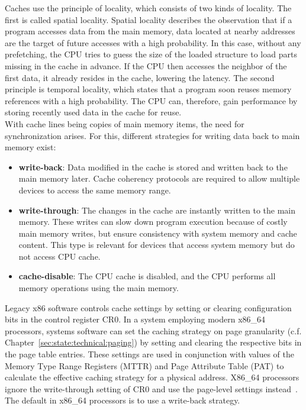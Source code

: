 Caches use the principle of locality, which consists of two kinds of locality.
The first is called spatial locality. Spatial locality describes the observation
that if a program accesses data from the main memory, data located at nearby
addresses are the target of future accesses with a high probability. In this
case, without any prefetching, the CPU tries to guess the size of the loaded
structure to load parts missing in the cache in advance. If the CPU then
accesses the neighbor of the first data, it already resides in the cache,
lowering the latency. The second principle is temporal locality, which states
that a program soon reuses memory references with a high probability. The CPU
can, therefore, gain performance by storing recently used data in the cache for
reuse.\\

With cache lines being copies of main memory items, the need for synchronization
arises. For this, different strategies for writing data back to main memory
exist:
\begin{itemize}
  \item \textbf{write-back}: Data modified in the cache is stored and written
    back to the main memory later. Cache coherency protocols are required to
    allow multiple devices to access the same memory range.
  \item \textbf{write-through}: The changes in the cache are instantly written
    to the main memory. These writes can slow down program execution because of
    costly main memory writes, but ensure consistency with system memory and
    cache content. This type is relevant for devices that access system memory
    but do not access CPU cache.
  \item \textbf{cache-disable}: The CPU cache is disabled, and the CPU
    performs all memory operations using the main memory.
\end{itemize}
Legacy x86 software controls cache settings by setting or clearing configuration
bits in the control register CR0. In a system employing modern x86\_64
processors, systems software can set the caching strategy on page granularity
(c.f. Chapter~\ref{sec:state:technical:paging}) by setting and clearing the
respective bits in the page table entries. These settings are used in
conjunction with values of the Memory Type Range Registers (MTTR) and Page
Attribute Table (PAT) to calculate the effective caching strategy for a physical
address. X86\_64 processors ignore the write-through setting of CR0 and use the
page-level settings instead~\cite{amd_manual}. The default in x86\_64 processors
is to use a write-back strategy.


